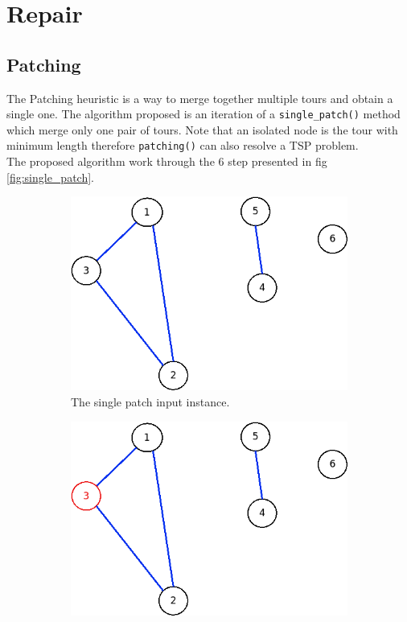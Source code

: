 \chapter{Repair}
\section{Patching} \label{section:patching}
The Patching heuristic is a way to merge together multiple tours and obtain a single one.
The algorithm proposed is an iteration of a \texttt{single\_patch()} method which merge only one pair of tours. Note that an isolated node is the tour with minimum length therefore \texttt{patching()} can also resolve a TSP problem. \\
The proposed algorithm work through the 6 step presented in fig \ref{fig:single_patch}.
\begin{figure}[!h]
	\begin{subfigure}{.26\columnwidth}
		\includegraphics[width=\columnwidth]{img/patching1.png}
		\caption{The single patch input instance.}
		\label{fig:patching1}
	\end{subfigure}
\hfill%
	\begin{subfigure}{.26\columnwidth}
		\includegraphics[width=\columnwidth]{img/patching2.png}

\end{subfigure}
\end{figure}
